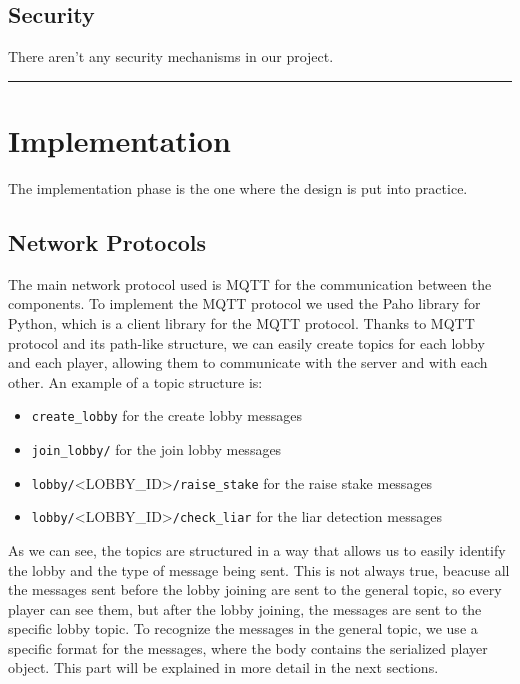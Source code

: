\documentclass{scrartcl}
\begin{document}
\subsection{Security}\label{security}

There aren't any security mechanisms in our project. \newline


\begin{center}\rule{0.5\linewidth}{0.5pt}\end{center}

\section{Implementation}\label{implementation}

The implementation phase is the one where the design is put into practice.
\subsection{Network Protocols}\label{network-protocols}
The main network protocol used is MQTT for the communication between the components. 
To implement the MQTT protocol we used the Paho library for Python, which is a client library for the MQTT protocol. \newline
Thanks to MQTT protocol and its path-like structure, we can easily create topics for each lobby and each player, allowing them to communicate with the server and with each other. \newline
An example of a topic structure is:
\begin{itemize}
  \item \texttt{create\_lobby} for the create lobby messages
  \item \texttt{join\_lobby/} for the join lobby messages
  \item \texttt{lobby/}\textless LOBBY\_ID\textgreater\texttt{/raise\_stake} for the raise stake messages
  \item \texttt{lobby/}\textless LOBBY\_ID\textgreater\texttt{/check\_liar} for the liar detection messages
\end{itemize}

As we can see, the topics are structured in a way that allows us to easily identify the lobby and the type of message being sent. This is not always true, beacuse all the messages sent before the lobby joining are sent to the general topic, so every player can see them, but after the lobby joining, the messages are sent to the specific lobby topic. \newline
To recognize the messages in the general topic, we use a specific format for the messages, where the body contains the serialized player object. This part will be explained in more detail in the next sections. \newline
\end{document}
